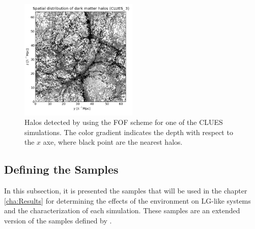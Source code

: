 \begin{figure}[htbp]
	\centering
	\includegraphics[width=0.5\textwidth]
	{./figures/3_nbody_simulations/Halos_Spatial_Distribution(CLUES_16953).png}

	\caption{\small{Halos detected by using the FOF scheme for one of the 
	CLUES simulations. The color gradient indicates the depth with respect to 
	the	$x$ axe, where black point are the nearest halos.}}
	
	\label{fig:CLUES_FOF}
\end{figure}




	\subsection{Defining the Samples}
	\label{subsec:SampleOfPairsToUse}
	

In this subsection, it is presented the samples that will be used in the 
chapter \ref{cha:Results} for determining the effects of the environment on
LG-like systems and the characterization of each simulation. These samples 
are an extended version of the samples defined by \cite{forero2011}.



